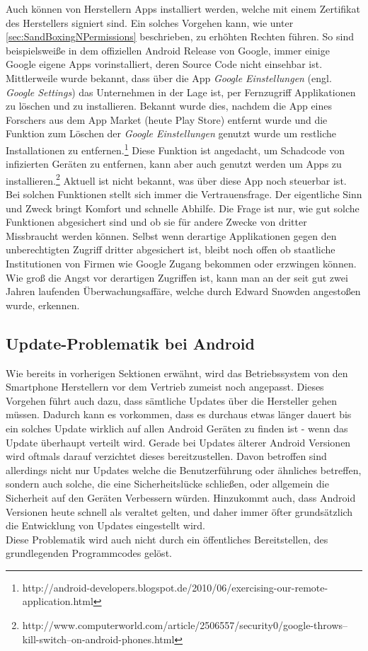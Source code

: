 Auch können von Herstellern Apps installiert werden, welche mit einem Zertifikat des Herstellers signiert sind. Ein solches Vorgehen kann, wie unter \ref*{sec:SandBoxingNPermissions} beschrieben, zu erhöhten Rechten führen.
So sind beispielsweiße in dem offiziellen Android Release von Google, immer einige Google eigene Apps vorinstalliert, deren Source Code nicht einsehbar ist. Mittlerweile wurde bekannt, dass über die App \textit{Google Einstellungen} (engl. \textit{Google Settings}) das Unternehmen in der Lage ist, per Fernzugriff Applikationen zu löschen und zu installieren. Bekannt wurde dies, nachdem die App eines Forschers aus dem App Market (heute Play Store) entfernt wurde und die Funktion zum Löschen der \textit{Google Einstellungen} genutzt wurde um restliche Installationen zu entfernen.\footnote{http://android-developers.blogspot.de/2010/06/exercising-our-remote-application.html} 
Diese Funktion ist angedacht, um Schadcode von infizierten Geräten zu entfernen, kann aber auch genutzt werden um Apps zu installieren.\footnote{http://www.computerworld.com/article/2506557/security0/google-throws--kill-switch--on-android-phones.html} Aktuell ist nicht bekannt, was über diese App noch steuerbar ist.\\
Bei solchen Funktionen stellt sich immer die Vertrauensfrage. Der eigentliche Sinn und Zweck bringt Komfort und schnelle Abhilfe. Die Frage ist nur, wie gut solche Funktionen abgesichert sind und ob sie für andere Zwecke von dritter Missbraucht werden können. Selbst wenn derartige Applikationen gegen den unberechtigten Zugriff dritter abgesichert ist, bleibt noch offen ob staatliche Institutionen von Firmen wie Google Zugang bekommen oder erzwingen können. Wie groß die Angst vor derartigen Zugriffen ist, kann man an der seit gut zwei Jahren laufenden Überwachungsaffäre, welche durch Edward Snowden angestoßen wurde, erkennen.

\subsection{Update-Problematik bei Android}
Wie bereits in vorherigen Sektionen erwähnt, wird das Betriebssystem von den Smartphone Herstellern vor dem Vertrieb zumeist noch angepasst. Dieses Vorgehen führt auch dazu, dass sämtliche Updates über die Hersteller gehen müssen. Dadurch kann es vorkommen, dass es durchaus etwas länger dauert bis ein solches Update wirklich auf allen Android Geräten zu finden ist - wenn das Update überhaupt verteilt wird. Gerade bei Updates älterer Android Versionen wird oftmals darauf verzichtet dieses bereitzustellen. Davon betroffen sind allerdings nicht nur Updates welche die Benutzerführung oder ähnliches betreffen, sondern auch solche, die eine Sicherheitslücke schließen, oder allgemein die Sicherheit auf den Geräten Verbessern würden. Hinzukommt auch, dass Android Versionen heute schnell als veraltet gelten, und daher immer öfter grundsätzlich die Entwicklung von Updates eingestellt wird.\cite{Drake2014}\\
Diese Problematik wird auch nicht durch ein öffentliches Bereitstellen, des grundlegenden Programmcodes gelöst.

